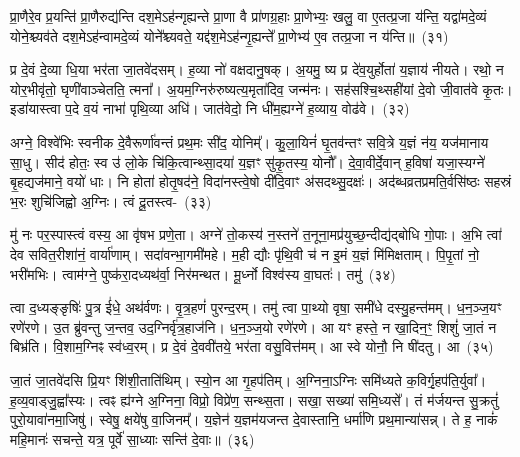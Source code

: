 प्रा॒णैरे॒व प्र॒यन्ति॑ प्रा॒णैरुद्य॑न्ति दश॒मे\-ऽह॑न्गृह्यन्ते प्रा॒णा वै प्रा॑णग्र॒हाः प्रा॒णेभ्यः॒ खलु॒ वा ए॒तत्प्र॒जा य॑न्ति॒ यद्वा॑मदे॒व्यं योने॒श्च्यव॑ते दश॒मे\-ऽह॑न्वामदे॒व्यं योने᳚श्च्यवते॒ यद्द॑श॒मे\-ऽह॑न्गृ॒ह्यन्ते᳚ प्रा॒णेभ्य॑ ए॒व तत्प्र॒जा न य॑न्ति॥~(३१)

{\anuvakamend[{तत्प्रा॑णग्र॒हाः स॒प्तत्रिꣳ॑शच्च}]}%

प्र दे॒वं दे॒व्या धि॒या भर॑ता जा॒तवे॑दसम्। ह॒व्या नो॑ वक्षदा\-नु॒षक्। अ॒यमु॒ ष्य प्र दे॑व॒युर्\mbox{}होता॑ य॒ज्ञाय॑ नीयते। रथो॒ न यो\-र॒भी\-वृ॑तो॒ घृणी॑वाञ्चेतति॒ त्मना᳚। अ॒यम॒ग्निरु॑रुष्यत्य॒मृता॑दिव॒ जन्म॑नः। सह॑सश्चि॒थ्सही॑यां दे॒वो जी॒वात॑वे कृ॒तः। इडा॑यास्त्वा प॒दे व॒यं नाभा॑ पृथि॒व्या अधि॑। जात॑वेदो॒ नि धी॑म॒ह्यग्ने॑ ह॒व्याय॒ वोढ॑वे।~(३२)

अग्ने॒ विश्वे॑भिः स्वनीक दे॒वैरूर्णा॑वन्तं प्रथ॒मः सी॑द॒ योनिम्᳚। कु॒ला॒यिनं॑ घृ॒तव॑न्तꣳ सवि॒त्रे य॒ज्ञं न॑य॒ यज॑मानाय सा॒धु। सीद॑ होतः॒ स्व उ॑ लो॒के चि॑कि॒त्वान्थ्सा॒दया॑ य॒ज्ञꣳ सु॑कृ॒तस्य॒ योनौ᳚। दे॒वा॒वीर्दे॒वान् ह॒विषा॑ यजा॒स्यग्ने॑ बृ॒हद्यज॑माने॒ वयो॑ धाः। नि होता॑ होतृ॒षद॑ने॒ विदा॑नस्त्वे॒षो दी॑दि॒वाꣳ अ॑सदथ्सु॒दक्षः॑। अद॑ब्ध\-व्रत\-प्रमति॒र्वसि॑ष्ठः सहस्रं भ॒रः शुचि॑जिह्वो अ॒ग्निः। त्वं दू॒तस्त्व-~(३३)

मु॑ नः पर॒स्पास्त्वं वस्य॒ आ वृ॑षभ प्रणे॒ता। अग्ने॑ तो॒कस्य॑ न॒स्तने॑ त॒नूना॒मप्र॑युच्छ॒न्दीद्य॑द्बोधि गो॒पाः। अ॒भि त्वा॑ देव सवित॒रीशा॑नं॒ वार्या॑णाम्। सदा॑वन्भा॒गमी॑महे। म॒ही द्यौः पृ॑थि॒वी च॑ न इ॒मं य॒ज्ञं मि॑मिक्षताम्। पि॒पृ॒तां नो॒ भरी॑मभिः। त्वाम॑ग्ने॒ पुष्क॑रा॒दध्यथ॑र्वा॒ निर॑मन्थत। मू॒र्ध्नो विश्व॑स्य वा॒घतः॑। तमु॑~(३४)

त्वा द॒ध्यङ्ङृषिः॑ पु॒त्र ई॑धे॒ अथ॑र्वणः। वृ॒त्र॒हणं॑ पुरन्द॒रम्। तमु॑ त्वा पा॒थ्यो वृषा॒ समी॑धे दस्यु॒हन्त॑मम्। ध॒न॒ञ्ज॒यꣳ रणे॑रणे। उ॒त ब्रु॑वन्तु ज॒न्तव॒ उद॒ग्निर्वृ॑त्र॒हाज॑नि। ध॒न॒ञ्ज॒यो रणे॑रणे। आ यꣳ हस्ते॒ न खा॒दिन॒ꣳ॒ शिशुं॑ जा॒तं न बिभ्र॑ति। वि॒शाम॒ग्निꣴ स्व॑ध्व॒रम्। प्र दे॒वं दे॒ववी॑तये॒ भर॑ता वसु॒वित्त॑मम्। आ स्वे योनौ॒ नि षी॑दतु। आ~(३५)


जा॒तं जा॒तवे॑दसि प्रि॒यꣳ शि॑शी॒ताति॑थिम्। स्यो॒न आ गृ॒ह\-प॑तिम्। अ॒ग्निना॒\-ऽग्निः समि॑ध्यते क॒विर्गृ॒हप॑ति॒र्युवा᳚। ह॒व्य॒वाड्\-जु॒ह्वा᳚स्यः। त्वꣴ ह्य॑ग्ने अ॒ग्निना॒ विप्रो॒ विप्रे॑ण॒ सन्थ्स॒ता। सखा॒ सख्या॑ समि॒ध्यसे᳚। तं म॑र्जयन्त सु॒क्रतुं॑ पुरो॒यावा॑नमा॒जिषु॑। स्वेषु॒ क्षये॑षु वा॒जिनम्᳚। य॒ज्ञेन॑ य॒ज्ञम॑यजन्त दे॒वास्तानि॒ धर्मा॑णि प्रथ॒मान्या॑सन्न्। ते ह॒ नाकं॑ महि॒मानः॑ सचन्ते॒ यत्र॒ पूर्वे॑ सा॒ध्याः सन्ति॑ दे॒वाः॥~(३६)

{\anuvakamend[{वोढ॑वे दू॒तस्त्वन्तमु॑ सीद॒त्वा यत्र॑ च॒त्वारि॑ च}]}%

